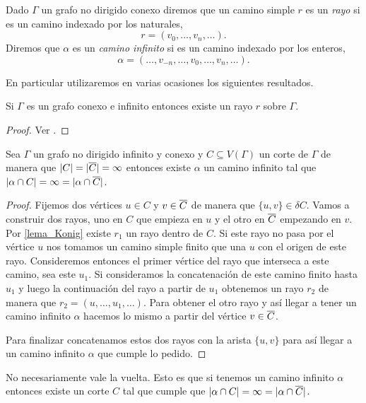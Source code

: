 \documentclass[tesis.tex]{subfiles}
\begin{document}
\begin{deff}
	Dado $\Gamma$ un grafo no dirigido conexo diremos que un camino simple $r$ es un \emph{rayo} si es un camino indexado por los naturales,
	\[
	r = (v_0, \dots, v_{n}, \dots).
	\]	
	Diremos que $\alpha$ es un \emph{camino infinito} si es un camino indexado por los enteros,
	\[
	\alpha = ( \dots, v_{-n}, \dots, v_0, \dots, v_{n}, \dots ).
	\]
\end{deff}		


En particular utilizaremos en varias ocasiones los siguientes resultados.


\begin{lema}[König]\label{lema_Konig}
	Si $\Gamma$ es un grafo conexo e infinito entonces existe un rayo $r$ sobre $\Gamma$.
\end{lema}
\begin{proof}
	Ver \cite[p.215]{diestel2005graph}.
\end{proof}


\begin{lema}\label{lema_camino_infinito_cortado}
	Sea $\Gamma$ un grafo no dirigido infinito y conexo y $C \subseteq V(\Gamma)$ un corte de $\Gamma$ de manera que $|C| = |\overline C| = \infty$ entonces existe $\alpha$ un camino infinito tal que 
	$|\alpha \cap C| = \infty = |\alpha \cap \overline C|$.
\end{lema}

\begin{proof}
	Fijemos dos vértices $u \in C$ y $v \in \overline C$ de manera que $\{u,v\} \in \delta C$.
	Vamos a construir dos rayos, uno en $C$ que empieza en $u$ y el otro en $\overline C$ empezando en $v$.
	Por \ref{lema_Konig} existe $r_{1}$ un rayo dentro de $C$.
	Si este rayo no pasa por el vértice $u$ nos tomamos un camino simple finito que una $u$ con el origen de este rayo.
	Consideremos entonces el primer vértice del rayo que interseca a este camino, sea este $u_{1}$.
	Si consideramos la concatenación de este camino finito hasta $u_{1}$ y luego la continuación del rayo a partir de $u_{1}$ obtenemos 
	un rayo $r_{2}$ de manera que $r_{2} = (u, \dots, u_{1}, \dots)$.
	Para obtener el otro rayo y así llegar a tener un camino infinito $\alpha$ hacemos lo mismo a partir del vértice $v \in \overline C$. 
	
	Para finalizar concatenamos estos dos rayos con la arista $\{u,v\}$ para así llegar a un camino infinito $\alpha$ que cumple lo pedido. 
	
\end{proof}


No necesariamente vale la vuelta.
Esto es que si tenemos un camino infinito $\alpha$ entonces existe un corte $C$ tal que cumple que $|\alpha \cap C| = \infty = |\alpha \cap \overline C|$.
\end{document}
